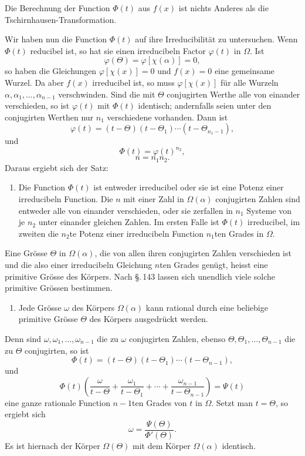 \documentclass[11pt]{article}
\begin{document}
Die Berechnung der Function $\Phi(t)$ aus $f(x)$ ist nichts Anderes als die Tschirnhausen-Transformation.

Wir haben nun die Function $\Phi(t)$ auf ihre Irreducibilität zu untersuchen. Wenn $\Phi(t)$ reducibel ist, so hat sie einen irreducibeln Factor $\varphi(t)$ in $\Omega$. Ist
\[
        \varphi(\Theta)=\varphi[\chi(\alpha)]=0,
\]
so haben die Gleichungen $\varphi[\chi(x)]=0$ und $f(x)=0$ eine gemeinsame Wurzel. Da aber $f(x)$ irreducibel ist, so muss $\varphi[\chi(x)]$ für alle Wurzeln $\alpha,\alpha_1,\ldots,\alpha_{n-1}$ verschwinden. Sind die mit $\Theta$ conjugirten Werthe alle von einander verschieden, so ist $\varphi(t)$ mit $\Phi(t)$ identisch; andernfalls seien unter den conjugirten Werthen nur $n_1$ verschiedene vorhanden. Dann ist
\[
\tag{10}
        \varphi(t)=(t-\Theta)(t-\Theta_1)\cdots(t-\Theta_{n_1-1}),
\]
und
\[
\tag{11}
        \Phi(t)=\varphi(t)^{n_2},
\]
\[
\tag{12}
        n=n_1n_2.
\]
Daraus ergiebt sich der Satz:
\begin{enumerate}[label=\arabic*.,leftmargin=2em,start=2]
\item Die Function $\Phi(t)$ ist entweder irreducibel oder sie ist eine Potenz einer irreducibeln Function. Die $n$ mit einer Zahl in $\Omega(\alpha)$ conjugirten Zahlen sind entweder alle von einander verschieden, oder sie zerfallen in $n_1$ Systeme von je $n_2$ unter einander gleichen Zahlen. Im ersten Falle ist $\Phi(t)$ irreducibel, im zweiten die $n_2$te Potenz einer irreducibeln Function $n_1$ten Grades in $\Omega$.
\end{enumerate}

Eine Grösse $\Theta$ in $\Omega(\alpha)$, die von allen ihren conjugirten Zahlen verschieden ist und die also einer irreducibeln Gleichung $n$ten Grades genügt, heisst eine primitive Grösse des Körpers. Nach §.\,143 lassen sich unendlich viele solche primitive Grössen bestimmen.

\begin{enumerate}[label=\arabic*.,leftmargin=2em,start=3]
\item Jede Grösse $\omega$ des Körpers $\Omega(\alpha)$ kann rational durch eine beliebige primitive Grösse $\Theta$ des Körpers ausgedrückt werden.
\end{enumerate}
Denn sind $\omega,\omega_1,\ldots,\omega_{n-1}$ die zu $\omega$ conjugirten Zahlen, ebenso $\Theta,\Theta_1,\ldots,\Theta_{n-1}$ die zu $\Theta$ conjugirten, so ist
\[
        \Phi(t)=(t-\Theta)(t-\Theta_1)\cdots(t-\Theta_{n-1}),
\]
und
\[
        \Phi(t)\left(
        \frac{\omega}{t-\Theta}+
        \frac{\omega_1}{t-\Theta_1}+\cdots+
        \frac{\omega_{n-1}}{t-\Theta_{n-1}}
        \right)=\Psi(t)
\]
eine ganze rationale Function $n-1$ten Grades von $t$ in $\Omega$. Setzt man $t=\Theta$, so ergiebt sich
\[
        \omega=\frac{\Psi(\Theta)}{\Phi'(\Theta)}.
\]
Es ist hiernach der Körper $\Omega(\Theta)$ mit dem Körper $\Omega(\alpha)$ identisch.
\end{document}
